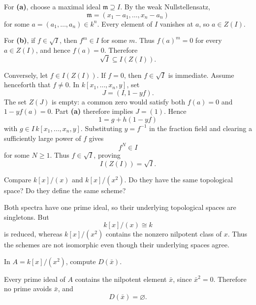 \begin{solution}
For \textbf{(a)}, choose a maximal ideal \(\mathfrak m\supseteq I\).
By the weak Nullstellensatz,
\[
\mathfrak m=(x_1-a_1,\dots,x_n-a_n)
\]
for some \(a=(a_1,\dots,a_n)\in k^n\). Every element of \(I\) vanishes at
\(a\), so \(a\in Z(I)\).

For \textbf{(b)}, if \(f\in\sqrt I\), then \(f^m\in I\) for some \(m\).
Thus \(f(a)^m=0\) for every \(a\in Z(I)\), and hence \(f(a)=0\). Therefore
\[
\sqrt I\subseteq I(Z(I)).
\]

Conversely, let \(f\in I(Z(I))\). If \(f=0\), then \(f\in\sqrt I\) is immediate. Assume henceforth that \(f\ne0\). In
\(k[x_1,\dots,x_n,y]\), set
\[
J=(I,1-yf).
\]
The set \(Z(J)\) is empty: a common zero would satisfy both \(f(a)=0\) and
\(1-yf(a)=0\). Part \textbf{(a)} therefore implies \(J=(1)\). Hence
\[
1=g+h(1-yf)
\]
with \(g\in I\,k[x_1,\dots,x_n,y]\). Substituting \(y=f^{-1}\) in the
fraction field and clearing a sufficiently large power of \(f\) gives
\[
f^N\in I
\]
for some \(N\ge1\). Thus \(f\in\sqrt I\), proving
\[
I(Z(I))=\sqrt I.
\]
\end{solution}


\begin{problem}[CP-V-0092]
\label{prob:cp-v-0092}
Compare \(k[x]/(x)\) and \(k[x]/(x^2)\). Do they have the same topological space? Do they define the same scheme?
\end{problem}

\begin{solution}
Both spectra have one prime ideal, so their underlying topological spaces are singletons. But
\[
k[x]/(x)\cong k
\]
is reduced, whereas \(k[x]/(x^2)\) contains the nonzero nilpotent class of \(x\). Thus the schemes are not isomorphic even though their underlying spaces agree.
\end{solution}


\begin{problem}[CP-V-0101]
\label{prob:cp-v-0101}
In \(A=k[x]/(x^2)\), compute \(D(\bar x)\).
\end{problem}

\begin{solution}
Every prime ideal of \(A\) contains the nilpotent element \(\bar x\), since \(\bar x^2=0\). Therefore no prime avoids \(\bar x\), and
\[
D(\bar x)=\varnothing.
\]
\end{solution}



